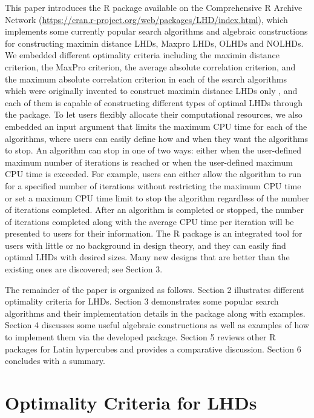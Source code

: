 This paper introduces the R package  available on the Comprehensive R Archive Network (\url{https://cran.r-project.org/web/packages/LHD/index.html}), which implements some currently popular search algorithms and algebraic constructions for constructing maximin distance LHDs, Maxpro LHDs, OLHDs and NOLHDs. We embedded different optimality criteria including the maximin distance criterion, the MaxPro criterion, the average absolute correlation criterion, and the maximum absolute correlation criterion in each of the search algorithms which were originally invented to construct maximin distance LHDs only \citep{morris1995exploratory, leary2003optimal, joseph2008orthogonal, liefvendahl2006study, chen2013optimizing}, and each of them is capable of constructing different types of optimal LHDs through the package. To let users flexibly allocate their computational resources, we also embedded an input argument that limits the maximum CPU time for each of the algorithms, where users can easily define how and when they want the algorithms to stop. An algorithm can stop in one of two ways: either when the user-defined maximum number of iterations is reached or when the user-defined maximum CPU time is exceeded. For example, users can either allow the algorithm to run for a specified number of iterations without restricting the maximum CPU time or set a maximum CPU time limit to stop the algorithm regardless of the number of iterations completed. After an algorithm is completed or stopped, the number of iterations completed along with the average CPU time per iteration will be presented to users for their information. The R package  is an integrated tool for users with little or no background in design theory, and they can easily find optimal LHDs with desired sizes. Many new designs that are better than the existing ones are discovered; see Section 3.

The remainder of the paper is organized as follows. Section 2 illustrates different optimality criteria for LHDs. Section 3 demonstrates some popular search algorithms and their implementation details in the  package along with examples. Section 4 discusses some useful algebraic constructions as well as examples of how to implement them via the developed package. Section 5 reviews other R packages for Latin hypercubes and provides a comparative discussion. Section 6 concludes with a summary.

\section{Optimality Criteria for LHDs}
\label{OC}

